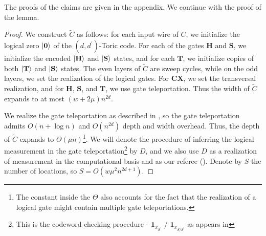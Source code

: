The proofs of the claims are given in the appendix. We continue with the proof of the lemma.
  \begin{proof}
    We construct $\tilde{C}$ as follows: for each input wire of $C$, we initialize the logical zero $\ket{\mathbf{0}}$ of the $(d,d^{\prime})$-Toric code. For each of the gates $\mathbf{H}$ and $\mathbf{S}$, we initialize the encoded $\ket{\mathbf{H}}$ and $\ket{\mathbf{S}}$ states, and for each $\mathbf{T}$, we initialize copies of both $\ket{\mathbf{T}}$ and $\ket{\mathbf{S}}$ states. The even layers of $\tilde{C}$ are sweep cycles, while on the odd layers, we set the realization of the logical gates. For $\mathbf{CX}$, we set the transversal realization, and for $\mathbf{H}$, $\mathbf{S}$, and $\mathbf{T}$, we use gate teleportation. Thus the width of $\tilde{C}$ expands to at most $ (w + 2\mu) n^{2d}$.  
    

    
    
    We realize the gate teleportation as described in , so the gate teleportation admits $O(n + \log n)$ and $O(n^{2d})$ depth and width overhead. Thus, the depth of $\tilde{C}$ expands to $\Theta(\mu n)$\footnote{The constant inside the $\Theta$ also accounts for the fact that the realization of a logical gate might contain multiple gate teleportations.}. We will denote the procedure of inferring the logical measurement in the gate teleportation\footnote{This is the codeword checking procedure - $ \mathbf{1}_{x_{S^{\prime}}}$ / $ \mathbf{1}_{x_{S/S^{\prime}}}$ as appears in  } by $D$, and we also use $D$ as a realization of measurement in the computational basis and as our referee (). Denote by $S$ the number of locations, so $S = O(w \mu^{2} n^{2d+1} )$.
  

\end{proof}
